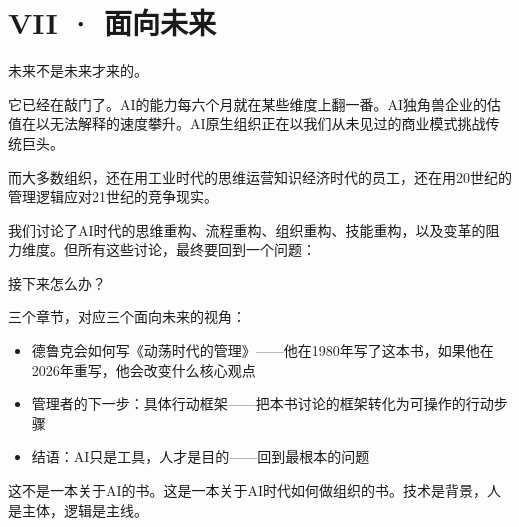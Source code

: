 \part{VII · 面向未来}



未来不是未来才来的。

它已经在敲门了。AI的能力每六个月就在某些维度上翻一番。AI独角兽企业的估值在以无法解释的速度攀升。AI原生组织正在以我们从未见过的商业模式挑战传统巨头。

而大多数组织，还在用工业时代的思维运营知识经济时代的员工，还在用20世纪的管理逻辑应对21世纪的竞争现实。

我们讨论了AI时代的思维重构、流程重构、组织重构、技能重构，以及变革的阻力维度。但所有这些讨论，最终要回到一个问题：

接下来怎么办？

三个章节，对应三个面向未来的视角：
\begin{itemize}
\item 德鲁克会如何写《动荡时代的管理》——他在1980年写了这本书，如果他在2026年重写，他会改变什么核心观点
\item 管理者的下一步：具体行动框架——把本书讨论的框架转化为可操作的行动步骤
\item 结语：AI只是工具，人才是目的——回到最根本的问题

\end{itemize}
这不是一本关于AI的书。这是一本关于AI时代如何做组织的书。技术是背景，人是主体，逻辑是主线。
